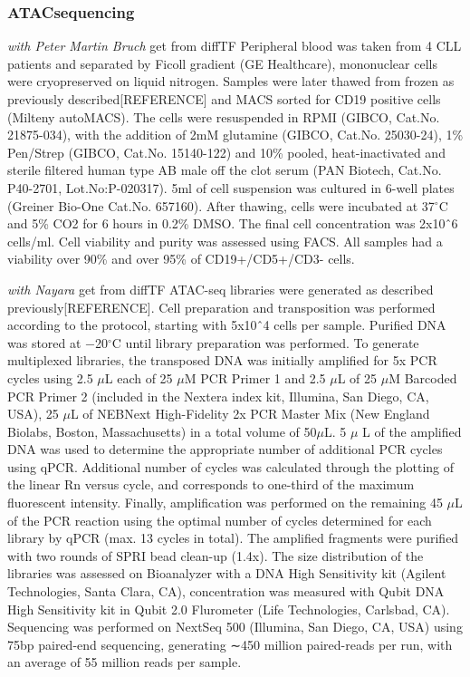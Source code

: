\documentclass[11pt, a4paper, twosided]{book}
\begin{document}
\hypertarget{atacsequencing}{%
\subsubsection{ATACsequencing}\label{atacsequencing}}

\emph{with Peter Martin Bruch} get from diffTF
Peripheral blood was taken from 4 CLL patients and separated by Ficoll gradient (GE Healthcare), mononuclear cells were cryopreserved on liquid nitrogen. Samples were later thawed from frozen as previously described{[}REFERENCE{]} and MACS sorted for CD19 positive cells (Milteny autoMACS). The cells were resuspended in RPMI (GIBCO, Cat.No. 21875-034), with the addition of 2mM glutamine (GIBCO, Cat.No. 25030-24), 1\% Pen/Strep (GIBCO, Cat.No. 15140-122) and 10\% pooled, heat-inactivated and sterile filtered human type AB male off the clot serum (PAN Biotech, Cat.No. P40-2701, Lot.No:P-020317). 5ml of cell suspension was cultured in 6-well plates (Greiner Bio-One Cat.No. 657160). After thawing, cells were incubated at 37\(^\circ\)C and 5\% CO2 for 6 hours in 0.2\% DMSO. The final cell concentration was 2x10ˆ6 cells/ml. Cell viability and purity was assessed using FACS. All samples had a viability over 90\% and over 95\% of CD19+/CD5+/CD3- cells.

\emph{with Nayara} get from diffTF
ATAC-seq libraries were generated as described previously{[}REFERENCE{]}. Cell preparation and transposition was performed according to the protocol, starting with 5x10ˆ4 cells per sample. Purified DNA was stored at −20\(^\circ\)C until library preparation was performed. To generate multiplexed libraries, the transposed DNA was initially amplified for 5x PCR cycles using 2.5 \(\mu\)L each of 25 \(\mu\)M PCR Primer 1 and 2.5 \(\mu\)L of 25 \(\mu\)M Barcoded PCR Primer 2 (included in the Nextera index kit, Illumina, San Diego, CA, USA), 25 \(\mu\)L of NEBNext High-Fidelity 2x PCR Master Mix (New England Biolabs, Boston, Massachusetts) in a total volume of 50\(\mu\)L. 5 \(\mu\) L of the amplified DNA was used to determine the appropriate number of additional PCR cycles using qPCR. Additional number of cycles was calculated through the plotting of the linear Rn versus cycle, and corresponds to one-third of the maximum fluorescent intensity. Finally, amplification was performed on the remaining 45 \(\mu\)L of the PCR reaction using the optimal number of cycles determined for each library by qPCR (max. 13 cycles in total). The amplified fragments were purified with two rounds of SPRI bead clean-up (1.4x). The size distribution of the libraries was assessed on Bioanalyzer with a DNA High Sensitivity kit (Agilent Technologies, Santa Clara, CA), concentration was measured with Qubit DNA High Sensitivity kit in Qubit 2.0 Flurometer (Life Technologies, Carlsbad, CA). Sequencing was performed on NextSeq 500 (Illumina, San Diego, CA, USA) using 75bp paired-end sequencing, generating ∼450 million paired-reads per run, with an average of 55 million reads per sample.
\end{document}
